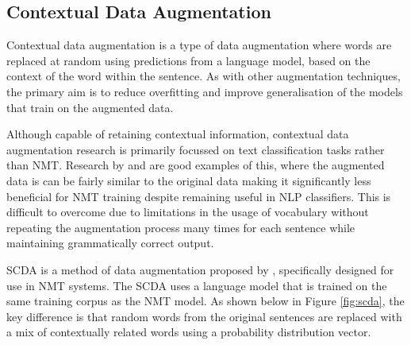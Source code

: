 





\subsection{Contextual Data Augmentation}

Contextual data augmentation is a type of data augmentation where words are replaced at random using predictions from a language model, based on the context of the word within the sentence. As with other augmentation techniques, the primary aim is to reduce overfitting and improve generalisation of the models that train on the augmented data. 

Although capable of retaining contextual information, contextual data augmentation research is primarily focussed on text classification tasks rather than \acrshort{NMT}. Research by \cite{wu_conditional_2018} and \cite{kobayashi_contextual_2018} are good examples of this, where the augmented data is can be fairly similar to the original data making it significantly less beneficial for \acrshort{NMT} training despite remaining useful in \acrshort{NLP} classifiers. This is difficult to overcome due to limitations in the usage of vocabulary without repeating the augmentation process many times for each sentence while maintaining grammatically correct output.

\acrfull{SCDA} is a method of data augmentation proposed by \cite{zhu_soft_2019}, specifically designed for use in \acrshort{NMT} systems. The \acrshort{SCDA} uses a language model that is trained on the same training corpus as the \acrshort{NMT} model. As shown below in Figure \ref{fig:scda}, the key difference is that random words from the original sentences are replaced with a mix of contextually related words using a probability distribution vector.


